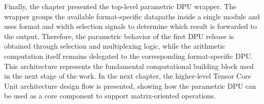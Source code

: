Finally, the chapter presented the top-level parametric DPU wrapper. The wrapper groups the available format-specific datapaths inside a single module and uses format and width selection signals to determine which result is forwarded to the output. Therefore, the parametric behavior of the first DPU release is obtained through selection and multiplexing logic, while the arithmetic computation itself remains delegated to the corresponding format-specific DPU. This architecture represents the fundamental computational building block used in the next stage of the work. In the next chapter, the higher-level Tensor Core Unit architecture design flow is presented, showing how the parametric DPU can be used as a core component to support matrix-oriented operations.